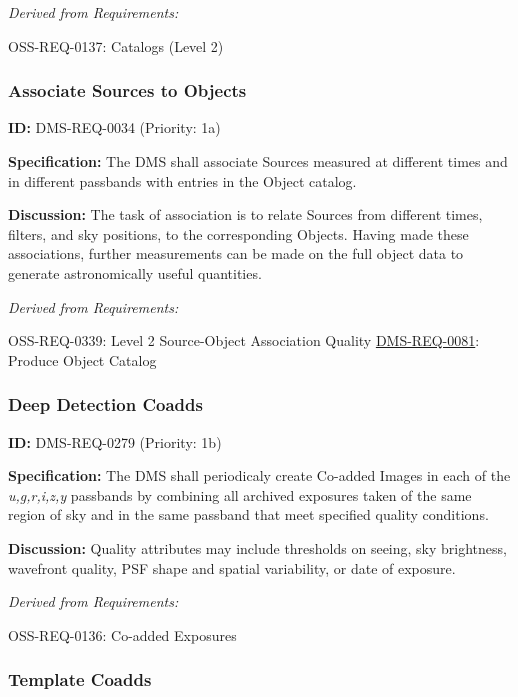 \documentclass[SE,toc,lsstdraft]{lsstdoc}
\begin{document}
\emph{Derived from Requirements:}

OSS-REQ-0137:
Catalogs (Level 2) \newline

\subsubsection{Associate Sources to Objects}

\label{DMS-REQ-0034}
\textbf{ID:} DMS-REQ-0034 (Priority: 1a)

\textbf{Specification:} The DMS shall associate Sources measured at different times and in different passbands with entries in the Object catalog.

\textbf{Discussion:} The task of association is to relate Sources from different times, filters, and sky positions, to the corresponding Objects. Having made these associations, further measurements can be made on the full object data to generate astronomically useful quantities.

\emph{Derived from Requirements:}

OSS-REQ-0339:
Level 2 Source-Object Association Quality \newline
\hyperref[DMS-REQ-0081]{DMS-REQ-0081}:
Produce Object Catalog \newline

\subsubsection{Deep Detection Coadds}

\label{DMS-REQ-0279}
\textbf{ID:} DMS-REQ-0279 (Priority: 1b)

\textbf{Specification:} The DMS shall periodicaly create Co-added Images in each of the \textit{u,g,r,i,z,y} passbands by combining all archived exposures taken of the same region of sky and in the same passband that meet specified quality conditions.

\textbf{Discussion: }Quality attributes may include thresholds on seeing, sky brightness, wavefront quality, PSF shape and spatial variability, or date of exposure.

\emph{Derived from Requirements:}

OSS-REQ-0136:
Co-added Exposures \newline

\subsubsection{Template Coadds}
\end{document}
